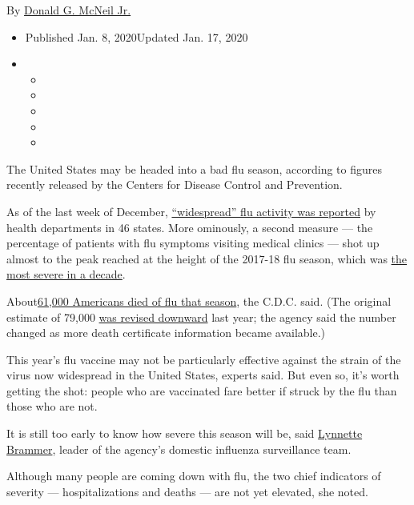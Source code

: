 By
\href{https://www.nytimes3xbfgragh.onion/by/donald-g-mcneil-jr}{Donald
G. McNeil Jr.}

\begin{itemize}
\item
  Published Jan. 8, 2020Updated Jan. 17, 2020
\item
  \begin{itemize}
  \item
  \item
  \item
  \item
  \item
  \end{itemize}
\end{itemize}

The United States may be headed into a bad flu season, according to
figures recently released by the Centers for Disease Control and
Prevention.

As of the last week of December,
\href{https://www.cdc.gov/flu/weekly/index.htm}{``widespread'' flu
activity was reported} by health departments in 46 states. More
ominously, a second measure --- the percentage of patients with flu
symptoms visiting medical clinics --- shot up almost to the peak reached
at the height of the 2017-18 flu season, which was
\href{https://www.nytimes3xbfgragh.onion/2018/01/26/health/flu-rates-deaths.html}{the
most severe in a decade}.

About\href{https://www.cdc.gov/flu/about/burden-averted/2017-2018.htm}{61,000
Americans died of flu that season}, the C.D.C. said. (The original
estimate of 79,000
\href{https://www.cdc.gov/flu/about/burden-averted/2017-2018.htm\#anchor_1574361280230}{was
revised downward} last year; the agency said the number changed as more
death certificate information became available.)

This year's flu vaccine may not be particularly effective against the
strain of the virus now widespread in the United States, experts said.
But even so, it's worth getting the shot: people who are vaccinated fare
better if struck by the flu than those who are not.

It is still too early to know how severe this season will be, said
\href{https://www.cdc.gov/flu/resource-center/partners/flu-fighter-lynnette-brammer.htm}{Lynnette
Brammer}, leader of the agency's domestic influenza surveillance team.

Although many people are coming down with flu, the two chief indicators
of severity --- hospitalizations and deaths --- are not yet elevated,
she noted.


